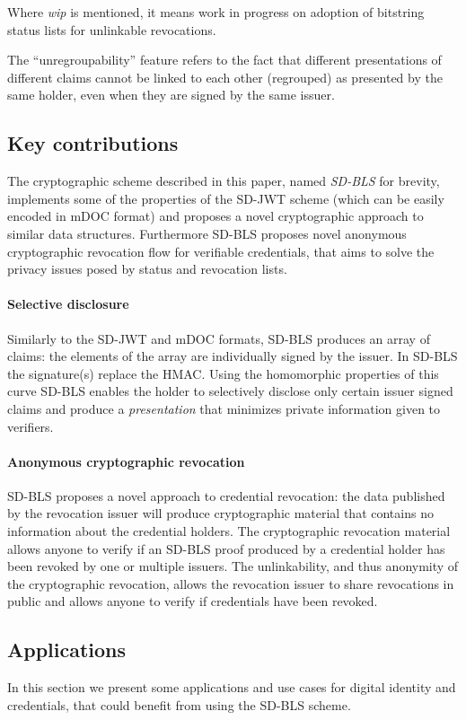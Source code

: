 Where \emph{wip} is mentioned, it means work in progress on adoption of
bitstring status lists for unlinkable revocations.

The ``unregroupability'' feature refers to the fact that different
presentations of different claims cannot be linked to each other
(regrouped) as presented by the same holder, even when they are signed
by the same issuer.

\subsection{Key contributions}
The cryptographic scheme described in this paper, named
\textit{SD-BLS} for brevity, implements some of the properties of the
SD-JWT scheme (which can be easily encoded in mDOC format) and
proposes a novel cryptographic approach to similar data
structures. Furthermore SD-BLS proposes novel anonymous cryptographic
revocation flow for verifiable credentials, that aims to solve the
privacy issues posed by status and revocation lists.

\paragraph{Selective disclosure}
Similarly to the SD-JWT and mDOC formats, SD-BLS produces an array of
claims: the elements of the array are individually signed by the
issuer. In SD-BLS the signature(s) replace the HMAC. Using the
homomorphic properties of this curve SD-BLS enables the holder to
selectively disclose only certain issuer signed claims and produce a
\textit{presentation} that minimizes private information given to
verifiers.

\paragraph{Anonymous cryptographic revocation}
SD-BLS proposes a novel approach to credential revocation: the data
published by the revocation issuer will produce cryptographic material
that contains no information about the credential holders. The
cryptographic revocation material allows anyone to verify if an SD-BLS
proof produced by a credential holder has been revoked by one or
multiple issuers. The unlinkability, and thus anonymity of the
cryptographic revocation, allows the revocation issuer to share
revocations in public and allows anyone to verify if credentials have
been revoked.

\subsection{Applications}
In this section we present some applications and use cases for digital
identity and credentials, that could benefit from using the SD-BLS
scheme.

